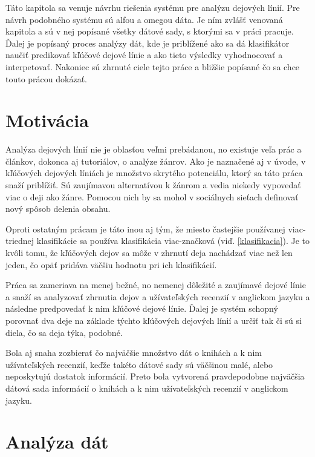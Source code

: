 Táto kapitola sa venuje návrhu riešenia systému pre analýzu dejových línií. Pre návrh podobného systému sú alfou a omegou dáta. Je ním zvlášť venovaná kapitola a sú v nej popísané všetky dátové sady, s ktorými sa v práci pracuje. Ďalej je popísaný proces analýzy dát, kde je priblížené ako sa dá klasifikátor naučiť predikovať kľúčové dejové línie a ako tieto výsledky vyhodnocovať a interpetovať. Nakoniec sú zhrnuté ciele tejto práce a bližšie popísané čo sa chce touto prácou dokázať. 

\section{Motivácia}

Analýza dejových línií nie je oblasťou veľmi prebádanou, no existuje veľa prác a článkov, dokonca aj tutoriálov, o analýze žánrov. Ako je naznačené aj v úvode, v kľúčových dejových líniách je množstvo skrytého potenciálu, ktorý sa táto práca snaží priblížiť. Sú zaujímavou alternatívou k žánrom a vedia niekedy vypovedať viac o deji ako žánre. Pomocou nich by sa mohol v sociálnych sieťach definovať nový spôsob delenia obsahu. 

Oproti ostatným prácam je táto inou aj tým, že miesto častejšie používanej viac-triednej klasifikácie sa používa klasifikácia viac-značková (viď. \ref{klasifikacia}). Je to kvôli tomu, že kľúčových dejov sa môže v zhrnutí deja nachádzať viac než len jeden, čo opäť pridáva väčšiu hodnotu pri ich klasifikácií.

Práca sa zameriava na menej bežné, no nemenej dôležité a zaujímavé dejové línie a snaží sa analyzovať zhrnutia dejov a užívateľských recenzií v anglickom jazyku a následne predpovedať k nim kľúčové dejové línie. Ďalej je systém schopný porovnať dva deje na základe týchto kľúčových dejových línií a určiť tak či sú si diela, čo sa deja týka, podobné.

Bola aj snaha zozbierať čo najväčšie množstvo dát o knihách a k nim užívateľských recenzií, keďže takéto dátové sady sú väčšinou malé, alebo neposkytujú dostatok informácií. Preto bola vytvorená pravdepodobne najväčšia dátová sada informácií o knihách a k nim užívateľských recenzií v anglickom jazyku.

\section{Analýza dát}

